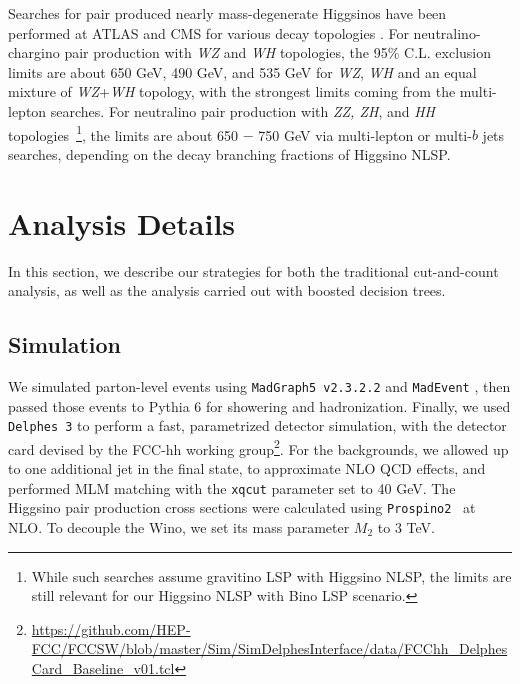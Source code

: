 \documentclass[a4paper,11pt]{article}
\begin{document}
Searches for pair produced nearly mass-degenerate Higgsinos  have been
performed at ATLAS and CMS for various decay  topologies
\cite{Aaboud:2018htj,Sirunyan:2018ubx,Aaboud:2018zeb}.  
For neutralino-chargino pair production with \emph{WZ} and \emph{WH} topologies, the 95\%
C.L. exclusion limits are about 650 GeV, 490 GeV, and 535 GeV for \emph{WZ}, \emph{WH}
and an equal mixture of \emph{WZ}+\emph{WH} topology, with the strongest limits coming from
the multi-lepton searches.  For neutralino pair production with \emph{ZZ, ZH}, and \emph{HH} topologies~\footnote{While such searches assume gravitino LSP with
Higgsino NLSP, the limits are still relevant for our Higgsino NLSP with Bino
LSP scenario.}, the limits are about 650 $-$ 750 GeV via multi-lepton or
multi-$b$ jets searches, depending on the decay branching fractions of Higgsino
NLSP. 


 

\section{Analysis Details}\label{sec:analysis}

In this section, we  describe our strategies for both the traditional
cut-and-count analysis, as well as the analysis carried out with boosted
decision trees. 

\subsection{Simulation}\label{simulation}

We simulated parton-level events using \texttt{MadGraph5 v2.3.2.2} and
\texttt{MadEvent} \cite{Alwall:2014hca}, then passed those events to Pythia 6
\cite{Sjostrand:2006za} for showering and hadronization. Finally, we used
\texttt{Delphes 3} \cite{deFavereau:2013fsa} to perform a fast, parametrized
detector simulation, with the detector card devised by the FCC-hh working
group\footnote{\url{https://github.com/HEP-FCC/FCCSW/blob/master/Sim/SimDelphesInterface/data/FCChh_DelphesCard_Baseline_v01.tcl}}.
For the backgrounds, we allowed up to one additional jet in the final state, to
approximate NLO QCD effects, and performed MLM matching with the \texttt{xqcut}
parameter set to 40 GeV. The Higgsino pair production cross sections were
calculated using \texttt{Prospino2}~\cite{Beenakker:1999xh} at NLO.  
To decouple the Wino, we set its mass parameter $M_2$ to 3 TeV.  
\end{document}
